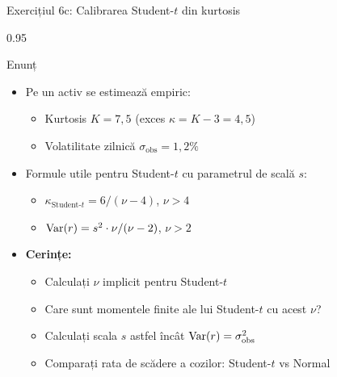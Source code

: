 \documentclass[9pt, aspectratio=169, t]{beamer}
\begin{document}
\begin{frame}[shrink=25]{Exercițiul 6c: Calibrarea Student-$t$ din kurtosis}
\begin{cminipage}{0.95\textwidth}
\begin{block}{Enunț}
\begin{itemize}\setlength{\itemsep}{0pt}
    \item Pe un activ se estimează empiric:
    \begin{itemize}\setlength{\itemsep}{0pt}
        \item Kurtosis $K = 7{,}5$ (exces $\kappa = K - 3 = 4{,}5$)
        \item Volatilitate zilnică $\sigma_{\text{obs}} = 1{,}2\%$
    \end{itemize}
    \item Formule utile pentru Student-$t$ cu parametrul de scală $s$:
    \begin{itemize}\setlength{\itemsep}{0pt}
        \item $\kappa_{\text{Student-}t} = 6/(\nu - 4)$, $\nu > 4$
        \item $\text{Var}(r) = s^2 \cdot \nu/(\nu - 2)$, $\nu > 2$
    \end{itemize}
    \item \textbf{Cerințe:}
    \begin{itemize}\setlength{\itemsep}{0pt}
        \item Calculați $\nu$ implicit pentru Student-$t$
        \item Care sunt momentele finite ale lui Student-$t$ cu acest $\nu$?
        \item Calculați scala $s$ astfel încât $\text{Var}(r) = \sigma_{\text{obs}}^2$
        \item Comparați rata de scădere a cozilor: Student-$t$ vs Normal
    \end{itemize}
\end{itemize}
\end{block}
\end{cminipage}
\end{frame}
\end{document}
